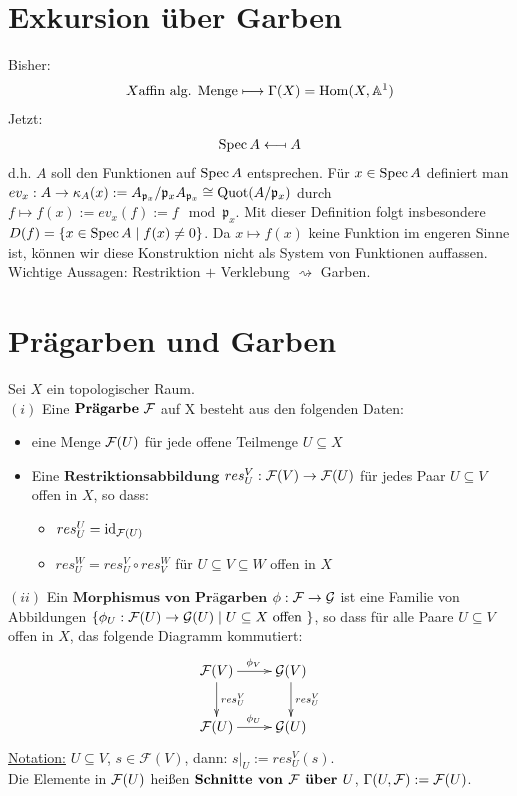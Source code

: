 \section*{Exkursion über Garben}

Bisher: 
\begin{align}
X \text{affin alg. Menge} \longmapsto \Gamma(X) = \operatorname{\mathrm{Hom}}(X, \mathbb{A}^{1})
\end{align}
Jetzt:
\begin{align}
\operatorname{Spec} A \longmapsfrom A
\end{align} 
d.h. $A$ soll den Funktionen auf $\operatorname{Spec} A$ entsprechen.
Für $x \in \operatorname{Spec} A$ definiert man $ev_{x} : A \to \kappa_A(x) := A_{\mathfrak{p}_x} / \mathfrak{p}_{x}A_{\mathfrak{p}_{x}} \cong \operatorname{Quot}(A/\mathfrak{p}_{x})$ durch $f \mapsto f(x) := ev_{x}(f) := f \mod \mathfrak{p}_{x}$.
Mit dieser Definition folgt insbesondere $D(f) = \{ x \in \operatorname{Spec} A \mid f(x) \neq 0\}$. Da $x \mapsto f(x)$ keine Funktion im engeren Sinne ist, können wir diese Konstruktion nicht als System von Funktionen auffassen.\\
Wichtige Aussagen: Restriktion $+$ Verklebung $\rightsquigarrow$ Garben.

\section{Prägarben und Garben}
\label{sec:garben}

\begin{defn}
\label{def:praegarbe}
Sei $X$ ein topologischer Raum. \\
$(i)$ Eine $\textbf{Prägarbe}\  \mathcal{F}$ auf X besteht aus den folgenden Daten:
\begin{itemize}
	\item eine Menge $\mathcal{F}(U)$ für jede offene Teilmenge $U \subseteq X$
	\item Eine $\textbf{Restriktionsabbildung} $ $res^{V}_{U} : \mathcal{F}(V) \to \mathcal{F}(U)$ für jedes Paar $U \subseteq V$ offen in $X$, so dass:
	\begin{itemize}
		\item $res^{U}_{U} = \operatorname{\mathrm{id}}_{\mathcal{F}(U)}$
		\item $res^{W}_{U} = res^{V}_{U} \circ res^{W}_{V}$ für $U \subseteq V \subseteq W$ offen in $X$
	\end{itemize}
\end{itemize}
$(ii)$ Ein $\textbf{Morphismus von Prägarben}$ $\phi : \mathcal{F} \to \mathcal{G}$ ist eine Familie von Abbildungen $\{\phi_{U} : \mathcal{F}(U) \to \mathcal{G}(U) \mid U \subseteq X \text{ offen }\}$, so dass für alle Paare $U \subseteq V$ offen in $X$, das folgende Diagramm kommutiert:
\[
\xymatrix{\sheaf{F}(V)\ar^{\phi_V}@{->}[r]\ar^{res^{V}_{U}}@{->}[d]  & \sheaf{G}(V) \ar[d]^{res^{V}_{U}}\\
	\sheaf{F}(U)\ar^{\phi_{U}}@{->}[r] & \sheaf{G}(U) }
\]
\underline{Notation:} $U \subseteq V$, $s \in \mathcal{F}(V)$, dann: $s|_{U} := res^{V}_{U}(s)$.\\ Die Elemente in $\mathcal{F}(U)$ heißen $\textbf{Schnitte von } \mathcal{F} \textbf{ über }U$, $\Gamma(U, \mathcal{F}) := \mathcal{F}(U)$.
\end{defn}


